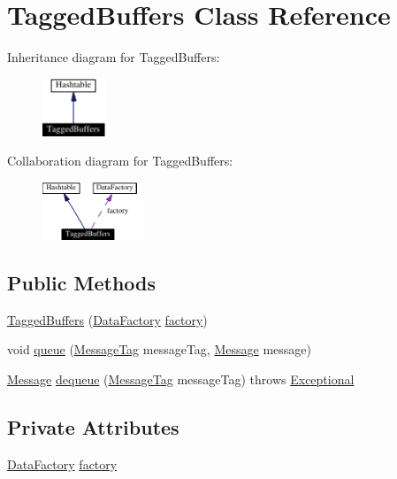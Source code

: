 \hypertarget{classTaggedBuffers}{
\section{Tagged\-Buffers  Class Reference}
\label{classTaggedBuffers}
}
Inheritance diagram for Tagged\-Buffers:\begin{figure}[H]
\begin{center}
\leavevmode
\includegraphics[width=53pt]{classTaggedBuffers__inherit__graph}
\end{center}
\end{figure}
Collaboration diagram for Tagged\-Buffers:\begin{figure}[H]
\begin{center}
\leavevmode
\includegraphics[width=86pt]{classTaggedBuffers__coll__graph}
\end{center}
\end{figure}
\subsection*{Public Methods}
\begin{CompactItemize}
\item 
\hyperlink{classTaggedBuffers_a0}{Tagged\-Buffers} (\hyperlink{interfaceDataFactory}{Data\-Factory} \hyperlink{classTaggedBuffers_o0}{factory})
\item 
void \hyperlink{classTaggedBuffers_a1}{queue} (\hyperlink{interfaceMessageTag}{Message\-Tag} message\-Tag, \hyperlink{interfaceMessage}{Message} message)
\item 
\hyperlink{interfaceMessage}{Message} \hyperlink{classTaggedBuffers_a2}{dequeue} (\hyperlink{interfaceMessageTag}{Message\-Tag} message\-Tag) throws \hyperlink{classExceptional}{Exceptional}
\end{CompactItemize}
\subsection*{Private Attributes}
\begin{CompactItemize}
\item 
\hyperlink{interfaceDataFactory}{Data\-Factory} \hyperlink{classTaggedBuffers_o0}{factory}
\end{CompactItemize}


